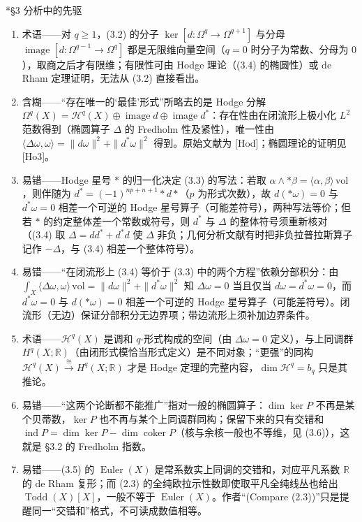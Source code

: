 \documentclass[11pt]{amsart}
\makeatletter
\def\subsection{\@startsection{subsection}{2}%
   \z@{1.25\linespacing\@plus.7\linespacing}{.5\linespacing}%
   {\normalfont\bfseries}}
\theoremstyle{definition}
\theoremstyle{remark}
\theoremstyle{plain}
\numberwithin{equation}{section}
\renewcommand{\:}{\colon}
\newcommand{\RR}{{\mathbb R}}
\DeclareMathOperator{\coker}{coker}
\DeclareMathOperator{\ind}{ind}
\DeclareMathOperator{\Euler}{Euler}
\DeclareMathOperator{\Todd}{Todd}
\DeclareMathOperator{\image}{image}
\newcommand{\sH}{\mathscr{H}}
\makeatother
\begin{document}
\subsection*{§3 分析中的先驱}
\begin{enumerate}[leftmargin=2.2em,itemsep=2pt,topsep=2pt]
  \item 术语——对 $q\ge1$，(3.2) 的分子 $\ker[d:\Omega^q\to\Omega^{q+1}]$ 与分母 $\image[d:\Omega^{q-1}\to\Omega^q]$ 都是无限维向量空间（$q=0$ 时分子为常数、分母为 $0$），取商之后才有限维；有限性可由 Hodge 理论（(3.4) 的椭圆性）或 de Rham 定理证明，无法从 (3.2) 直接看出。
  \item 含糊——“存在唯一的‘最佳’形式”所略去的是 Hodge 分解 $\Omega^q(X)=\sH^q(X)\oplus\image d\oplus\image d^*$：存在性由在闭流形上极小化 $L^2$ 范数得到（椭圆算子 $\Delta$ 的 Fredholm 性及紧性），唯一性由 $\langle\Delta\omega,\omega\rangle=\|d\omega\|^2+\|d^*\omega\|^2$ 得到。原始文献为 [Hod]；椭圆理论的证明见 [Ho3]。
  \item 易错——Hodge 星号 $*$ 的归一化决定 (3.3) 的写法：若取 $\alpha\wedge *\beta=\langle\alpha,\beta\rangle\,\mathrm{vol}$，则伴随为 $d^*=(-1)^{np+n+1}*d*$（$p$ 为形式次数），故 $d(*\omega)=0$ 与 $d^*\omega=0$ 相差一个可逆的 Hodge 星号算子（可能差符号），两种写法等价；但若 $*$ 的约定整体差一个常数或符号，则 $d^*$ 与 $\Delta$ 的整体符号须重新核对（(3.4) 取 $\Delta=dd^*+d^*d$ 使 $\Delta$ 非负；几何分析文献有时把非负拉普拉斯算子记作 $-\Delta$，与 (3.4) 相差一个整体符号）。
  \item 易错——“在闭流形上 (3.4) 等价于 (3.3) 中的两个方程”依赖分部积分：由 $\int_X\langle\Delta\omega,\omega\rangle\,\mathrm{vol}=\|d\omega\|^2+\|d^*\omega\|^2$ 知 $\Delta\omega=0$ 当且仅当 $d\omega=d^*\omega=0$，而 $d^*\omega=0$ 与 $d(*\omega)=0$ 相差一个可逆的 Hodge 星号算子（可能差符号）。闭流形（无边）保证分部积分无边界项；带边流形上须补加边界条件。
  \item 术语——$\sH^q(X)$ 是调和 $q$-形式构成的空间（由 $\Delta\omega=0$ 定义），与上同调群 $H^q(X;\RR)$（由闭形式模恰当形式定义）是不同对象；“更强”的同构 $\sH^q(X)\xrightarrow{\;\cong\;}H^q(X;\RR)$ 才是 Hodge 定理的完整内容，$\dim\sH^q=b_q$ 只是其推论。
  \item 易错——“这两个论断都不能推广”指对一般的椭圆算子：$\dim\ker P$ 不再是某个贝蒂数，$\ker P$ 也不再与某个上同调群同构；保留下来的只有交错和 $\ind P=\dim\ker P-\dim\coker P$（核与余核一般也不等维，见 (3.6)），这就是 §3.2 的 Fredholm 指数。
  \item 易错——(3.5) 的 $\Euler(X)$ 是常系数实上同调的交错和，对应平凡系数 $\RR$ 的 de Rham 复形；而 (2.3) 的全纯欧拉示性数即使取平凡全纯线丛也给出 $\Todd(X)[X]$，一般不等于 $\Euler(X)$。作者“(Compare (2.3))”只是提醒同一“交错和”格式，不可读成数值相等。

\end{enumerate}
\end{document}
